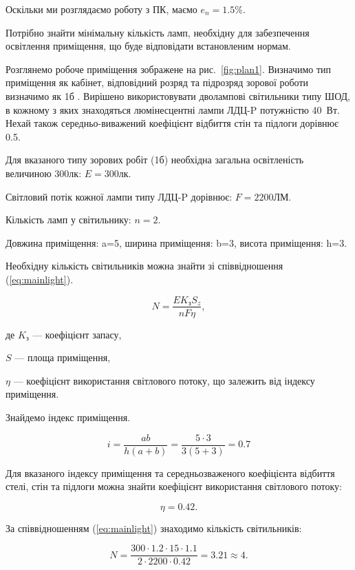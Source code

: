 \documentclass{diploma}
\begin{document}
Оскільки ми розглядаємо роботу з ПК, маємо $ e_{n} = 1.5\%. $
 
Потрібно знайти мінімальну кількість ламп, необхідну для забезпечення освітлення приміщення, що буде відповідати встановленим нормам.

Розглянемо робоче приміщення зображене на рис.~\ref{fig:plan1}. Визначимо тип приміщення як кабінет, відповідний розряд та підрозряд зорової роботи визначимо як 1б \cite{oh2}. Вирішено використовувати дволампові світильники типу ШОД, в кожному з яких знаходяться люмінесцентні лампи ЛДЦ-P потужністю 40~Вт. Нехай також середньо-виважений коефіцієнт відбиття стін та підлоги дорівнює 0.5. 
		
Для вказаного типу зорових робіт (1б) необхідна загальна освітленість величиною 300лк: $E=300 лк$.

Світловий потік кожної лампи типу ЛДЦ-P дорівнює: $F=2200 ЛМ$.	

Кількість ламп у світильнику: $n=2$.	
	
Довжина приміщення: a=5, ширина приміщення: b=3, висота приміщення: h=3.

Необхідну кількість світильників можна знайти зі співвідношення (\ref{eq:mainlight}).
	
		\begin{equation}
		\label{eq:mainlight}
		N= \frac{EK_зS_z}{nF\eta},	
	\end{equation}

де $K_з$ --- коефіцієнт запасу,

$S$ --- площа приміщення,

$\eta$ ---  коефіцієнт використання світлового потоку, що залежить від індексу приміщення. 

	Знайдемо індекс приміщення.
	
	\begin{equation}
		\label{eq:index}
		i= \frac{ab}{h(a+b)}=\frac{5\cdot3}{3(5+3)}=0.7	
	\end{equation}
	

	Для вказаного індексу приміщення та середньозваженого коефіцієнта відбиття стелі, стін та підлоги можна знайти коефіцієнт використання світлового потоку:
	
		\begin{equation}
		\label{eq:eta2}
		\eta =0.42.	
	\end{equation}

За співвідношенням (\ref{eq:mainlight}) знаходимо кількість світильників:

	\begin{equation}
		\label{eq:mainlightnum}
		N= \frac{300\cdot1.2\cdot15\cdot1.1}{2\cdot2200\cdot0.42}=3.21\approx4.	
	\end{equation}
\end{document}
